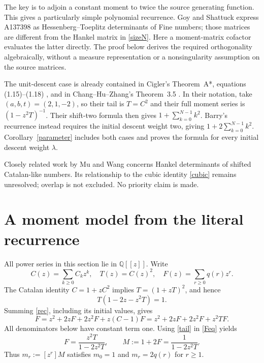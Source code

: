 \documentclass[11pt]{article}
\newcommand{\Q}{\mathbb Q}
\begin{document}
The key is to adjoin a constant moment to twice the source generating
function. This gives a particularly simple polynomial recurrence.
Goy and Shattuck \cite[Theorem 3, p.~425]{goy} express A137398
as Hessenberg--Toeplitz determinants of Fine numbers; those matrices
are different from the Hankel matrix in \eqref{sizeN}. Here a
moment-matrix cofactor evaluates the latter directly. The proof below
derives the required orthogonality algebraically, without a measure
representation or a nonsingularity assumption on the source matrices.

The unit-descent case is already contained in Cigler's
Theorem~A*, equations (1.15)--(1.18) \cite{cigler}, and in
Chang--Hu--Zhang's Theorem~3.5 \cite{chang}. In their notation,
take $(a,b,t)=(2,1,-2)$, so their tail is $T=C^2$ and their
full moment series is $(1-z^2T)^{-1}$. Their shift-two formula
then gives $1+\sum_{k=0}^{N-1}k^2$.
Barry's recurrence instead requires the initial descent weight two,
giving $1+2\sum_{k=0}^{N-1}k^2$. Corollary~\ref{parameter}
includes both cases and proves the formula for every initial descent
weight $\lambda$.

Closely related work by Mu and Wang \cite{mu-wang} concerns Hankel
determinants of shifted Catalan-like numbers. Its relationship to the cubic
identity \eqref{cubic} remains unresolved; overlap is not excluded.
No priority claim is made.

\section{A moment model from the literal recurrence}
All power series in this section lie in $\Q[[z]]$. Write
\[
C(z)=\sum_{k\geq0}C_kz^k,\quad T(z)=C(z)^2,\quad
F(z)=\sum_{r\geq0}q(r)z^r.
\]
The Catalan identity $C=1+zC^2$ implies
$T=(1+zT)^2$, and hence
\begin{equation}\label{tail}
T(1-2z-z^2T)=1.
\end{equation}
Summing \eqref{rec}, including its initial values, gives
\begin{equation}\label{Feq}
F=z^2+2zF+2z^2F+z(C-1)F
 =z^2+2zF+2z^2F+z^2TF.
\end{equation}
All denominators below have constant term one. Using \eqref{tail}
in \eqref{Feq} yields
\begin{equation}\label{moment}
F=\frac{z^2T}{1-2z^2T},\qquad
M:=1+2F=\frac1{1-2z^2T}.
\end{equation}
Thus $m_r:=[z^r]M$ satisfies $m_0=1$ and $m_r=2q(r)$ for $r\geq1$.
\end{document}
